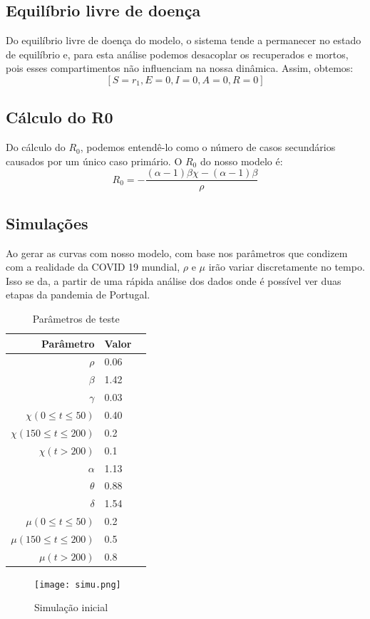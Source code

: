 \documentclass[12pt]{article}
\begin{document}
\subsection{Equilíbrio livre de doença}

 Do equilíbrio livre de doença do modelo, o sistema tende a permanecer no estado de equilíbrio e, para esta análise podemos desacoplar os recuperados e mortos, pois esses compartimentos não influenciam na nossa dinâmica. Assim, obtemos:
 \[ [S=r_1, E=0, I=0, A=0,R=0] \]
 
\subsection{Cálculo do R0}

Do cálculo do $R_0$, podemos entendê-lo como o número de casos secundários causados por um único caso primário. O $R_0$ do nosso modelo é:
\[ R_0 = -\frac{(\alpha-1)\beta\chi-(\alpha-1)\beta}{\rho} \]

\subsection{Simulações}

Ao gerar as curvas com nosso modelo, com base nos parâmetros que condizem com a realidade da COVID 19 mundial, $\rho$ e $\mu$ irão variar discretamente no tempo. Isso se da, a partir de uma rápida análise dos dados onde é possível ver duas etapas da pandemia de Portugal.

\begin{table}[h]
\centering
\caption{Parâmetros de teste}
\vspace{0.5cm}
\begin{tabular}{r|lr}

Parâmetro & Valor\\ %
\hline                               %
$\rho $ & 0.06      \\
$\beta $ & 1.42  \\
$\gamma$ & 0.03           \\
$\chi(0 \leq t \leq 50)$ & 0.40      \\
$\chi(150 \leq t \leq 200)$ & 0.2      \\
$\chi(t > 200)$ & 0.1      \\
$\alpha$ & 1.13 \\
$ \theta $ & 0.88 \\
$ \delta$ & 1.54 \\
$\mu(0 \leq t \leq 50)$ & 0.2     \\
$\mu(150 \leq t \leq 200)$ & 0.5       \\
$\mu(t > 200)$ & 0.8      \\
\end{tabular}
\end{table}
\begin{figure}[H]
    \centering
    \texttt{[image: simu.png]}
    \caption{Simulação inicial}
\end{figure}
\end{document}

